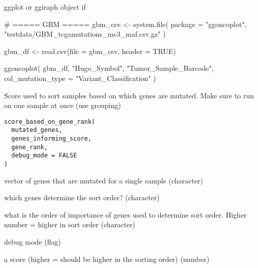 \documentclass[a4paper]{book}
\begin{document}
%
\begin{Value}
ggplot or ggiraph object if 
\end{Value}
%
\begin{Examples}
\begin{ExampleCode}
# ===== GBM =====
gbm_csv <- system.file(
  package = "ggoncoplot",
  "testdata/GBM_tcgamutations_mc3_maf.csv.gz"
)

gbm_df <- read.csv(file = gbm_csv, header = TRUE)

ggoncoplot(
  gbm_df,
  "Hugo_Symbol",
  "Tumor_Sample_Barcode",
  col_mutation_type = "Variant_Classification"
)

\end{ExampleCode}
\end{Examples}
%
\begin{Description}\relax
Score used to sort samples based on which genes are mutated. Make sure to run on one sample at once (use grouping)
\end{Description}
%
\begin{Usage}
\begin{verbatim}
score_based_on_gene_rank(
  mutated_genes,
  genes_informing_score,
  gene_rank,
  debug_mode = FALSE
)
\end{verbatim}
\end{Usage}
%
\begin{Arguments}
\begin{ldescription}
\item[\code{mutated\_genes}] vector of genes that are mutated for a single sample (character)

\item[\code{genes\_informing\_score}] which genes determine the sort order? (character)

\item[\code{gene\_rank}] what is the order of importance of genes used to determine sort order. Higher number = higher in sort order (character)

\item[\code{debug\_mode}] debug mode (flag)
\end{ldescription}
\end{Arguments}
%
\begin{Value}
a score (higher = should be higher in the sorting order) (number)
\end{Value}
%
\end{document}
